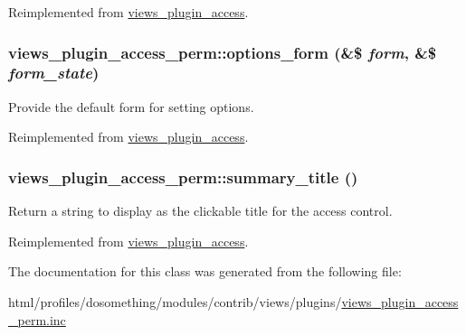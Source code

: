 Reimplemented from \hyperlink{classviews__plugin__access_a3d52dc2603a2991a46a3c212a04097d2}{views\_\-plugin\_\-access}.\hypertarget{classviews__plugin__access__perm_af662e29c6b61b1a476b7b9ba368f5650}{
\subsubsection[{options\_\-form}]{\setlength{\rightskip}{0pt plus 5cm}views\_\-plugin\_\-access\_\-perm::options\_\-form (\&\$ {\em form}, \/  \&\$ {\em form\_\-state})}}
\label{classviews__plugin__access__perm_af662e29c6b61b1a476b7b9ba368f5650}
Provide the default form for setting options. 

Reimplemented from \hyperlink{classviews__plugin__access_a530865442ea42db5e720e6c49f3d16f2}{views\_\-plugin\_\-access}.\hypertarget{classviews__plugin__access__perm_a1e0e33b03ffddf2b98c60740222d8ca5}{
\subsubsection[{summary\_\-title}]{\setlength{\rightskip}{0pt plus 5cm}views\_\-plugin\_\-access\_\-perm::summary\_\-title ()}}
\label{classviews__plugin__access__perm_a1e0e33b03ffddf2b98c60740222d8ca5}
Return a string to display as the clickable title for the access control. 

Reimplemented from \hyperlink{classviews__plugin__access_ade500a95e599deffa417f8cbdd67bbf4}{views\_\-plugin\_\-access}.

The documentation for this class was generated from the following file:\begin{DoxyCompactItemize}
\item 
html/profiles/dosomething/modules/contrib/views/plugins/\hyperlink{views__plugin__access__perm_8inc}{views\_\-plugin\_\-access\_\-perm.inc}\end{DoxyCompactItemize}
